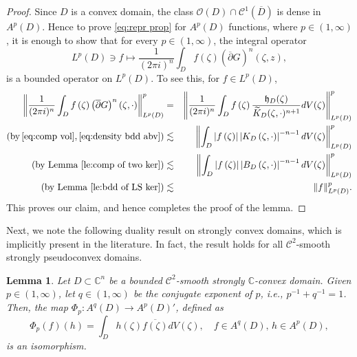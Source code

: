 \documentclass[11pt, oneside, reqno]{amsart}
\numberwithin{equation}{section}
\newtheorem{lemma}[theorem]{Lemma}
\theoremstyle{definition}
\newcommand{\beas}{\begin{eqnarray*}}
\newcommand{\eeas}{\end{eqnarray*}}
\newcommand{\hol}{\mathcal {O}}
\newcommand{\cont}{\mathcal C}
\newcommand{\C}{\mathbb C}
\newcommand{\ltt}{\left(}
\newcommand{\rtt}{\right)}
\newcommand{\Om}{\Omega}
\begin{document}
{\begin{proof}
Since $ D$ is a convex domain, the class $\hol\ltt D\rtt\cap\cont^1\ltt\overline D\rtt$ is dense in $A^p\ltt D\rtt$. Hence to prove \eqref{eq:repr prop} for $A^p( D)$ functions, where $p\in\ltt1,\infty\rtt$, it is enough to show that for every $p\in\ltt1,\infty\rtt$, the integral operator
\[
L^p( D)\ni f\mapsto\frac{1}{(2\pi i)^n}\int_ D f\ltt\zeta\rtt \ltt \overline \partial G\rtt^n\ltt\zeta,z\rtt,
\]
is a bounded operator on $L^p\ltt D\rtt$. To see this, for $f\in L^p\ltt D\rtt$,
\beas
\left\|\frac{1}{(2\pi i)^n}\int_ D f\ltt\zeta\rtt \ltt \overline \partial G\rtt^n\ltt\zeta,\cdot\rtt\right\|_{L^p(D)}^p&=&\left\|\frac{1}{(2\pi i)^n}\int_ D f\ltt\zeta\rtt \frac{\mathfrak h_D(\zeta)}{\widetilde K_D(\zeta,\cdot)^{n+1}}dV(\zeta)\right\|_{L^p(D)}^p\\
(\text{by}\,\eqref{eq:comp vol},\eqref{eq:density bdd abv})&\lesssim&\left\|\int_ D\left|f\ltt\zeta\rtt\right|\left|K_ D\ltt\zeta,\cdot\rtt\right|^{-n-1} dV(\zeta)\right\|_{L^p(D)}^p\\
(\text{by Lemma~\ref{le:comp of two ker}})&\lesssim&\left\|\int_ D\left|f\ltt\zeta\rtt\right|\left|B_ D\ltt\zeta,\cdot\rtt\right|^{-n-1} dV(\zeta)\right\|_{L^p(D)}^p\\
(\text{by Lemma~\ref{le:bdd of LS ker}})&\lesssim& \|f\|_{L^p(D)}^p.
\eeas
This proves our claim, and hence completes the proof of the lemma.
\end{proof}

Next, we note the following duality result on strongly convex domains, which is implicitly present in the literature. In fact, the result holds for all $\cont^2$-smooth strongly pseudoconvex domains. 
   


\begin{lemma}\label{le:dual of Ap}
Let $D\subset\C^n$ be a bounded $\cont^2$-smooth strongly $\C$-convex domain. Given $p\in(1,\infty)$, let $q\in(1,\infty)$ be the conjugate exponent of $p$, i.e., $p^{-1}+q^{-1}=1$. Then, the map
$\Phi_p:A^q\ltt D\rtt\rightarrow A^p( D)'$, defined as
\[
\Phi_p(f)(h)=\int_{D} h(\zeta)\overline{f(\zeta)} dV(\zeta), \quad f\in A^q\ltt D\rtt,\, h\in A^p\ltt D\rtt,
\]
is an isomorphism.
\end{lemma}

}
\end{document}
